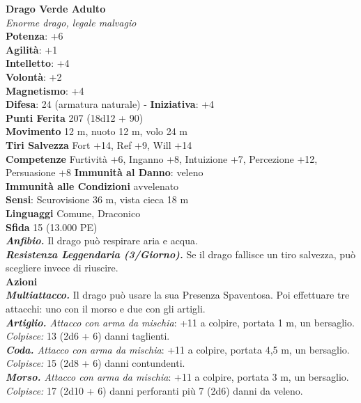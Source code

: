 \begin{multicols}{2}
\medskip\textbf{Drago Verde Adulto}\\
\emph{Enorme drago, legale malvagio}\\
\textbf{Potenza}: +6\\
\textbf{Agilità}: +1\\
\textbf{Intelletto}: +4\\
\textbf{Volontà}: +2\\
\textbf{Magnetismo}: +4\\
\textbf{Difesa}: 24 (armatura naturale) - \textbf{Iniziativa}: +4\\
\textbf{Punti Ferita} 207 (18d12 + 90)\\
\textbf{Movimento} 12 m, nuoto 12 m, volo 24 m\\
\textbf{Tiri Salvezza} Fort +14, Ref +9, Will +14\\
\textbf{Competenze} Furtività +6, Inganno +8, Intuizione +7, Percezione +12, Persuasione +8
\textbf{Immunità al Danno}: veleno\\
\textbf{Immunità alle Condizioni} avvelenato\\
\textbf{Sensi}: Scurovisione 36 m, vista cieca 18 m\\
\textbf{Linguaggi} Comune, Draconico\\
\textbf{Sfida} 15 (13.000 PE)\smallskip\\
\emph{\textbf{Anfibio.}} Il drago può respirare aria e acqua.\\
\emph{\textbf{Resistenza Leggendaria (3/Giorno).}} Se il drago fallisce un tiro salvezza, può scegliere invece di riuscire.\\
\smallskip\textbf{Azioni}\\
\emph{\textbf{Multiattacco.}} Il drago può usare la sua Presenza Spaventosa. Poi effettuare tre attacchi: uno con il morso e due con gli artigli.\\
\emph{\textbf{Artiglio.} Attacco con arma da mischia}: +11 a colpire, portata 1 m, un bersaglio.\\
\emph{Colpisce:} 13 (2d6 + 6) danni taglienti.\\
\emph{\textbf{Coda.} Attacco con arma da mischia}: +11 a colpire, portata 4,5 m, un bersaglio.\\
\emph{Colpisce:} 15 (2d8 + 6) danni contundenti. \\
\emph{\textbf{Morso.} Attacco con arma da mischia}: +11 a colpire, portata 3 m, un bersaglio.\\
\emph{Colpisce:} 17 (2d10 + 6) danni perforanti più 7 (2d6) danni da veleno.\\

\end{multicols}
